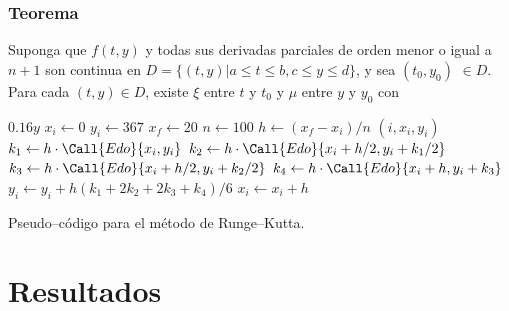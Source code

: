 \documentclass[english,spanish,Ce-table,Ce-theorem]{CabesHW}
\begin{document}
\subsubsection{Teorema}
Suponga que $f (t, y)$ y todas sus derivadas parciales de orden menor o igual a $n + 1$ son continua en $ D = \{(t, y) | a \leq t \leq b, c \leq y \leq d\}$, y sea $(t_0,y_0)$ $\in D$. Para cada $(t, y) \in D$, existe $\xi$ entre $t$  y $t_0$ y $\mu$ entre  $y$ y $y_0$ con

\begin{algorithm}[H]
    \centering
    \begin{myalg}[1]
        \State \Output $0.16 y$
    \EndFunction
    \State \phantom{}
    \State $x_i \gets 0$ 
    \State $y_i \gets 367$ 
    \State $x_f \gets 20$ 
    \State $n \gets 100$ 
    \State \phantom{}
    \State $h \gets (x_f - x_i)/n$ 
        \State \Output $(i, x_i, y_i)$
        \State \phantom{}
        \State $k_1 \gets h\cdot\Call{Edo}{x_i, y_i}$
        \State $k_2 \gets h\cdot\Call{Edo}{x_i+h/2, y_i+k_1/2}$
        \State $k_3 \gets h\cdot\Call{Edo}{x_i+h/2, y_i+k_2/2}$
        \State $k_4 \gets h\cdot\Call{Edo}{x_i+h, y_i+k_3}$
        \State \phantom{}
        \State $y_i \gets y_i + h(k_1 + 2k_2 + 2k_3 + k_4)/6$
        \State $x_i \gets x_i + h$
    \EndFor
    \end{myalg}
    \caption{Pseudo--código para el método de Runge--Kutta.}
    \label{alg:runge-kutta}
\end{algorithm}

\section{Resultados}
\end{document}
